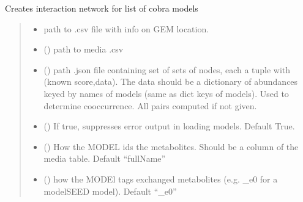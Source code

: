\documentclass[letterpaper,10pt,english]{sphinxmanual}
\begin{document}
\begin{fulllineitems}
\label{\detokenize{network_build:make_gem_network.get_pairwise_growth}}
\pysigstartsignatures
{}
\pysigstopsignatures
\sphinxAtStartPar
Creates interaction network for list of cobra models
\begin{quote}\begin{description}
\begin{itemize}
\item {} 
\sphinxAtStartPar
{} \textendash{} path to .csv file with info on GEM location.

\item {} 
\sphinxAtStartPar
{} () \textendash{} path to media .csv

\item {} 
\sphinxAtStartPar
{} () \textendash{} path .json file containing set of sets of nodes, each a tuple with (known score,data). The data should be a dictionary of abundances keyed by names of models (same as dict keys of models). Used to determine co\sphinxhyphen{}occurrence. All pairs computed if not given.

\item {} 
\sphinxAtStartPar
{} () \textendash{} If true, suppresses error output in loading models. Default True.

\item {} 
\sphinxAtStartPar
{} () \textendash{} How the MODEL ids the metabolites. Should be a column of the media table. Default “fullName”

\item {} 
\sphinxAtStartPar
{} () \textendash{} how the MODEl tags exchanged metabolites (e.g. \_e0 for a modelSEED model). Default “\_e0”


\end{itemize}
\end{description}
\end{quote}
\end{fulllineitems}
\end{document}
